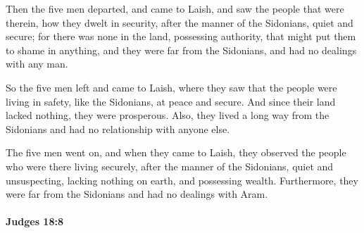 			\begin{versebox}
					\item[BHS] 
					\item[ASV] Then the five men departed, and came to Laish, and saw the people that were therein, how they dwelt in security, after the manner of the Sidonians, quiet and secure; for there was none in the land, possessing authority, that might put them to shame in anything, and they were far from the Sidonians, and had no dealings with any man.
					\item[NIV] So the five men left and came to Laish, where they saw that the people were living in safety, like the Sidonians, at peace and secure. And since their land lacked nothing, they were prosperous. Also, they lived a long way from the Sidonians and had no relationship with anyone else.
					\item[NRSV] The five men went on, and when they came to Laish, they observed the people who were there living securely, after the manner of the Sidonians, quiet and unsuspecting, lacking nothing on earth, and possessing wealth. Furthermore, they were far from the Sidonians and had no dealings with Aram.
			\end{versebox}

		\paragraph{Judges 18:8} %
			\label{JUDGES-18-8}


